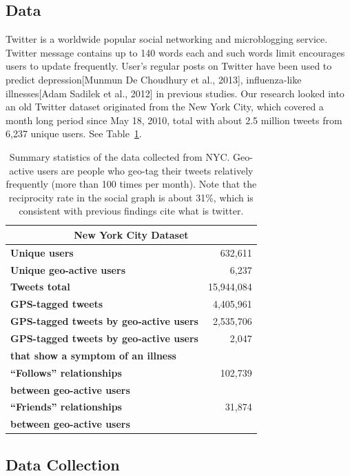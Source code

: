 \documentclass[11pt]{article}
\begin{document}
\subsection{Data}
Twitter is a worldwide popular social networking and microblogging service. Twitter message contains up to 140 words each and such words limit encourages users to update frequently. User's regular posts on Twitter have been used to predict depression[Munmun De Choudhury et al., 2013], influenza-like illnesses[Adam Sadilek et al., 2012] in previous studies. Our research looked into an old Twitter dataset originated from the New York City, which covered a month long period since May 18, 2010, total with about 2.5 million tweets from 6,237 unique users. See Table~\ref{table::dataset}.

\begin{table}[t]
\small
\centering
\begin{tabular}{ l | r }
\multicolumn{2}{c}{\textbf{New York City Dataset}} \\
\hline
\textbf{Unique users}&       632,611      \\
\hline
\textbf{Unique geo-active users}&        6,237       \\
\hline
\textbf{Tweets total}&        15,944,084\\
\hline
\textbf{GPS-tagged tweets}&   4,405,961\\
\hline
\textbf{GPS-tagged tweets by geo-active users}&  2,535,706\\
\hline
\textbf{GPS-tagged tweets by geo-active users}&  2,047 \\
\textbf{that show a symptom of an illness}&\\
\hline
\textbf{``Follows'' relationships}&  102,739  \\
\textbf{between geo-active users}&\\
\hline
\textbf{``Friends'' relationships}&   31,874   \\
\textbf{between geo-active users}&\\
\end{tabular}
\caption{\small Summary statistics of the data collected from NYC. Geo-active users are people who geo-tag their tweets relatively frequently (more than 100 times per month). Note that the reciprocity rate in the social graph is about 31\%, which is consistent with previous findings  cite what is twitter.} 
\label{table::dataset}
\end{table}
\subsection{Data Collection}
\end{document}
